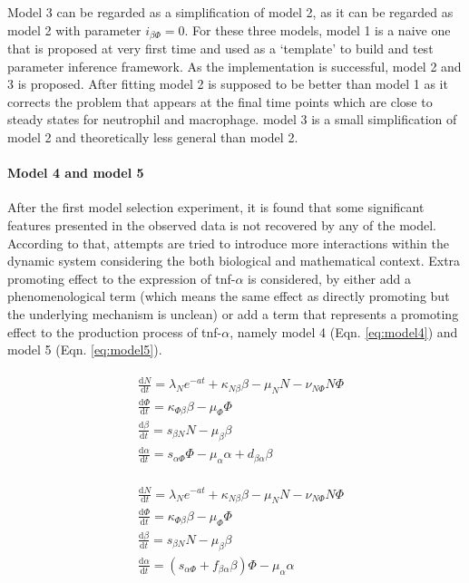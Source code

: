\documentclass[12pt,a4paper]{report}
\begin{document}
Model 3 can be regarded as a simplification of model 2, as it can be regarded as model 2 with parameter $i_{\beta\Phi}=0$. For these three models, model 1 is a naive one that is proposed at very first time and used as a `template' to build and test parameter inference framework. As the implementation is successful, model 2 and 3 is proposed. After fitting model 2 is supposed to be better than model 1 as it corrects the problem that appears at the final time points which are close to steady states for neutrophil and macrophage. model 3 is a small simplification of model 2 and theoretically less general than model 2.

\paragraph{Model 4 and model 5}

After the first model selection experiment, it is found that some significant features presented in the observed data is not recovered by any of the model. According to that, attempts are tried to introduce more interactions within the dynamic system considering the both biological and  mathematical context. Extra promoting effect to the expression of tnf-$\alpha$ is considered, by either add a phenomenological term (which means the same effect as directly promoting but the underlying mechanism is unclean) or add a term that represents a promoting effect to the production process of tnf-$\alpha$, namely model 4 (Eqn. \ref{eq:model4}) and model 5 (Eqn. \ref{eq:model5}).

\begin{align}
    \label{eq:model4}
    \begin{split}
        &\frac{\mathrm{d} N}{\mathrm{d} t}=\lambda_Ne^{-at}+\kappa_{N\beta}\beta-\mu_NN-\nu_{N\Phi}N\Phi\\
        &\frac{\mathrm{d} \Phi}{\mathrm{d} t}=\kappa_{\Phi\beta}\beta-\mu_\Phi\Phi\\
        &\frac{\mathrm{d} \beta}{\mathrm{d} t}=s_{\beta N}N-\mu_\beta\beta\\
        &\frac{\mathrm{d} \alpha}{\mathrm{d} t}=s_{\alpha\Phi}\Phi-\mu_\alpha\alpha+d_{\beta\alpha}\beta
    \end{split}
\end{align}

\begin{align}
    \label{eq:model5}
    \begin{split}
        &\frac{\mathrm{d} N}{\mathrm{d} t}=\lambda_Ne^{-at}+\kappa_{N\beta}\beta-\mu_NN-\nu_{N\Phi}N\Phi\\
        &\frac{\mathrm{d} \Phi}{\mathrm{d} t}=\kappa_{\Phi\beta}\beta-\mu_\Phi\Phi\\
        &\frac{\mathrm{d} \beta}{\mathrm{d} t}=s_{\beta N}N-\mu_\beta\beta\\
        &\frac{\mathrm{d} \alpha}{\mathrm{d} t}=(s_{\alpha\Phi}+f_{\beta\alpha}\beta)\Phi-\mu_\alpha\alpha
    \end{split}
\end{align}
\end{document}

